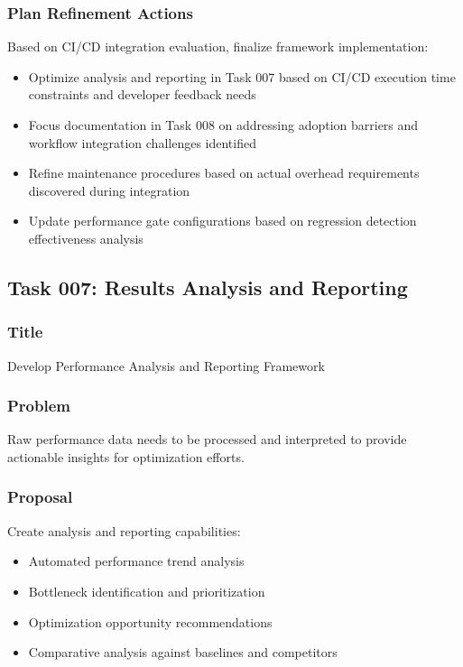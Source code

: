 \documentclass[11pt,a4paper]{article}
\begin{document}
\subsubsection{Plan Refinement Actions}
Based on CI/CD integration evaluation, finalize framework implementation:
\begin{itemize}
    \item Optimize analysis and reporting in Task 007 based on CI/CD execution time constraints and developer feedback needs
    \item Focus documentation in Task 008 on addressing adoption barriers and workflow integration challenges identified
    \item Refine maintenance procedures based on actual overhead requirements discovered during integration
    \item Update performance gate configurations based on regression detection effectiveness analysis
\end{itemize}


\subsection{Task 007: Results Analysis and Reporting}

\subsubsection{Title}
Develop Performance Analysis and Reporting Framework

\subsubsection{Problem}
Raw performance data needs to be processed and interpreted to provide actionable insights for optimization efforts.

\subsubsection{Proposal}
Create analysis and reporting capabilities:
\begin{itemize}
    \item Automated performance trend analysis
    \item Bottleneck identification and prioritization
    \item Optimization opportunity recommendations
    \item Comparative analysis against baselines and competitors
\end{itemize}
\end{document}
